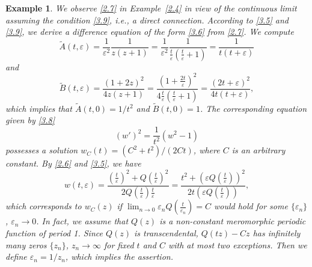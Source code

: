 \documentclass{amsart}
\newtheorem{example}[theorem]{Example}
\begin{document}
\begin{example}\label{ex3.1}
We observe \eqref{2.7} in Example~\ref{2.4} in view of the continuous limit assuming the condition \eqref{3.9}, i.e., a direct connection.
According to \eqref{3.5} and \eqref{3.9}, we derive a difference equation of the form
\eqref{3.6} from \eqref{2.7}. We compute
$$
\tilde A(t,\varepsilon)=\frac{1}{\varepsilon^2}\frac{1}{z(z+1)}=\frac{1}{\varepsilon^2}\frac{1}{\frac{t}{\varepsilon}(\frac{t}{\varepsilon}+1)}=\frac{1}{t(t+\varepsilon)}
$$
and
$$
\tilde B(t,\varepsilon)=\frac{(1+2z)^2}{4z(z+1)}=\frac{(1+\frac{2t}{\varepsilon})^2}{4\frac{t}{\varepsilon}(\frac{t}{\varepsilon}+1)}=\frac{(2t+\varepsilon)^2}{4t(t+\varepsilon)},
$$
which implies that $\tilde{A}(t,0)=1/t^2$ and $\tilde{B}(t,0)=1$.
The corresponding equation given by \eqref{3.8}
\begin{equation}
(w')^2=\frac{1}{t^2}(w^2-1)\label{3.10}
\end{equation}
possesses a solution $w_C(t)=(C^2+t^2)/(2Ct)$, where $C$ is an arbitrary constant.
By \eqref{2.6} and \eqref{3.5}, we have
\begin{equation*}
w(t,\varepsilon)=\frac{(\frac{t}{\varepsilon})^2+Q(\frac{t}{\varepsilon})^2}{2Q(\frac{t}{\varepsilon})\frac{t}{\varepsilon}}=\frac{t^2+(\varepsilon Q(\frac{t}{\varepsilon}))^2}{2t(\varepsilon Q(\frac{t}{\varepsilon}))},
\end{equation*}
which corresponds to $w_C(z)$ if $\displaystyle \lim_{n\to0} \varepsilon_n Q(\tfrac{t}{\varepsilon_n})=C$ would hold for some $\{\varepsilon_n\}$, $\varepsilon_n\to0$.
In fact, we assume that $Q(z)$ is a non-constant meromorphic periodic function of period 1.
Since $Q(z)$ is transcendental, $Q(tz)-Cz$ has infinitely many zeros $\{z_n\}$,
$z_n\to\infty$ for fixed $t$ and $C$
with at most two exceptions. Then we define $\varepsilon_n=1/z_n$, which implies the assertion.
\end{example}
\end{document}

